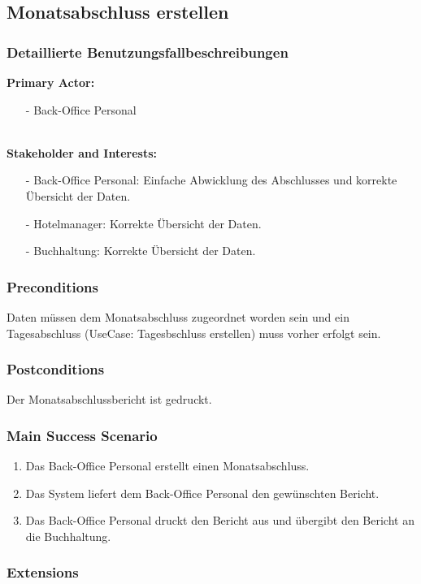 \documentclass[./detailed_overview_usecases.tex]{subfiles}
\begin{document}
    \subsection{Monatsabschluss erstellen}
    \subsubsection{Detaillierte Benutzungsfallbeschreibungen}
    \textbf{Primary Actor: }
    \begin{itemize}
        \item [-] Back-Office Personal
    \end{itemize}
    \\
    \textbf{Stakeholder and Interests:}
    \begin{itemize}
        \item[-] Back-Office Personal: Einfache Abwicklung des Abschlusses und korrekte Übersicht der Daten.
        \item[-] Hotelmanager: Korrekte Übersicht der Daten.
        \item[-] Buchhaltung: Korrekte Übersicht der Daten.
    \end{itemize}

    \subsubsection*{Preconditions}
    Daten müssen dem Monatsabschluss zugeordnet worden sein und ein Tagesabschluss (UseCase: Tagesbschluss erstellen) muss vorher erfolgt sein.
    \subsubsection*{Postconditions}
    Der Monatsabschlussbericht ist gedruckt.

    \subsubsection*{Main Success Scenario}
    \begin{enumerate}
        \item Das Back-Office Personal erstellt einen Monatsabschluss.
        \item Das System liefert dem Back-Office Personal den gewünschten Bericht.
        \item Das Back-Office Personal druckt den Bericht aus und übergibt den Bericht an die Buchhaltung.
    \end{enumerate}

    \subsubsection*{Extensions}
\end{document}
